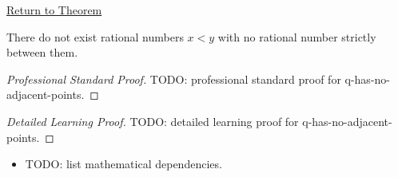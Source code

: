 \newpage
{}
\label{prf:q-has-no-adjacent-points}

\begin{remark*}[Return]
\hyperref[cor:q-has-no-adjacent-points]{Return to Theorem}
\end{remark*}

\begin{corollary*}
There do not exist rational numbers $x<y$ with no rational number strictly
between them.
\end{corollary*}

\begin{proof}[Professional Standard Proof]
\LRAProofBodyStart
TODO: professional standard proof for q-has-no-adjacent-points.
\end{proof}

\begin{proof}[Detailed Learning Proof]
\LRAProofBodyStart
TODO: detailed learning proof for q-has-no-adjacent-points.
\end{proof}

\begin{remark*}
\end{remark*}

\begin{dependencies}
\begin{itemize}
  \item TODO: list mathematical dependencies.
\end{itemize}
\end{dependencies}

\clearpage

